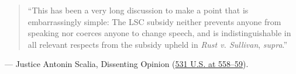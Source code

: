 \documentclass[12pt]{article}
\begin{document}
\begin{quote}
``This has been a very long discussion to make a point that is embarrassingly simple: The LSC subsidy neither prevents anyone from speaking nor coerces anyone to change speech, and is indistinguishable in all relevant respects from the subsidy upheld in \textit{Rust v. Sullivan}, \textit{supra}.''
\end{quote}
\noindent --- Justice Antonin Scalia, Dissenting Opinion (\href{https://supreme.justia.com/cases/federal/us/531/533/}{531 U.S. at 558--59}).
\end{document}
